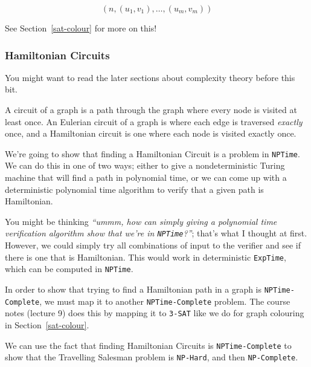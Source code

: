 \[
  (n, (u_1, v_1), \dots, (u_m, v_m))
\]

See Section~\ref{sat-colour} for more on this!

\subsubsection{Hamiltonian Circuits}

{\tiny \vspace{-2em} You might want to read the later sections about complexity 
theory before this bit.}

A circuit of a graph is a path through the graph where every node is visited at
least once. An Eulerian circuit of a graph is where each edge is traversed
\textit{exactly} once, and a Hamiltonian circuit is one where each node is
visited exactly once.


We're going to show that finding a Hamiltonian Circuit is a problem in
\texttt{NPTime}. We can do this in one of two ways; either to give a
nondeterministic Turing machine that will find a path in polynomial time, or we
can come up with a deterministic polynomial time algorithm to verify that a
given path is Hamiltonian.

You might be thinking \textit{``ummm, how can simply giving a polynomial time
verification algorithm show that we're in \texttt{NPTime}?''}; that's what I
thought at first. However, we could simply try all combinations of input to the
verifier and see if there is one that is Hamiltonian. This would work in
deterministic \texttt{ExpTime}, which can be computed in \texttt{NPTime}.

In order to show that trying to find a Hamiltonian path in a graph is
\texttt{NPTime-Complete}, we must map it to another \texttt{NPTime-Complete} 
problem. The course notes (lecture 9) does this by mapping it to \texttt{3-SAT} 
like we do for graph colouring in Section~\ref{sat-colour}.

We can use the fact that finding Hamiltonian Circuits is
\texttt{NPTime-Complete} to show that the Travelling Salesman problem is
\texttt{NP-Hard}, and then \texttt{NP-Complete}.


